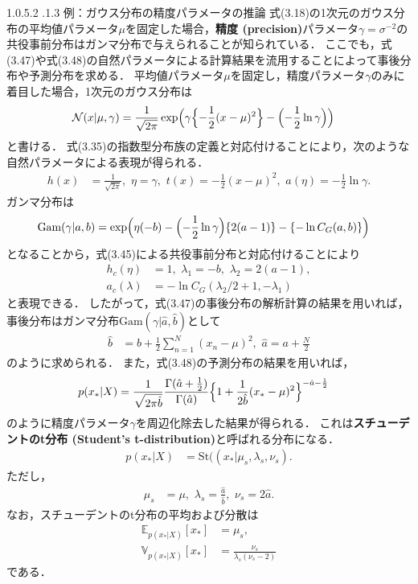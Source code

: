 \documentclass[11pt,a4paper]{jsarticle}
\makeatletter
\numberwithin{equation}{section}
\newcommand{\subsubsubsection}{\@startsection{paragraph}{4}{\z@}%
	{1.0\Cvs \@plus.5\Cdp \@minus.2\Cdp}%
	{.1\Cvs \@plus.3\Cdp}%
	{\reset@font\sffamily\normalsize}
}
\makeatother
\begin{document}
\subsubsubsection{例：ガウス分布の精度パラメータの推論}
式(3.18)の1次元のガウス分布の平均値パラメータ$\mu$を固定した場合，\textbf{精度 (precision)}パラメータ$\gamma = \sigma^{-2}$の共役事前分布はガンマ分布で与えられることが知られている．
ここでも，式(3.47)や式(3.48)の自然パラメータによる計算結果を流用することによって事後分布や予測分布を求める．
平均値パラメータ$\mu$を固定し，精度パラメータ$\gamma$のみに着目した場合，1次元のガウス分布は
\begin{align}
\mathcal{N}(x | \mu, \gamma)
& =
\frac{1}{\sqrt{2 \pi}} \exp \Bigl( \gamma \Bigl\{ -\frac{1}{2} (x - \mu)^2 \Bigr\} - \Bigl( -\frac{1}{2} \ln \gamma \Bigr) \Bigr)
\end{align}
と書ける．
式(3.35)の指数型分布族の定義と対応付けることにより，次のような自然パラメータによる表現が得られる．
\begin{align}
h(x)
& =
\frac{1}{\sqrt{2 \pi}}, \,\,
\eta = \gamma, \,\,
t(x) = -\frac{1}{2} (x - \mu)^2, \,\,
a(\eta) = -\frac{1}{2} \ln \gamma.
\end{align}
ガンマ分布は
\begin{align}
\mathrm{Gam}(\gamma | a, b)
& =
\exp \Bigl( \eta (-b) - \Bigl( -\frac{1}{2} \ln \gamma \Bigr) \{ 2 (a - 1) \} - \{ -\ln C_G(a, b) \} \Bigr)
\end{align}
となることから，式(3.45)による共役事前分布と対応付けることにより
\begin{align}
h_c(\eta)
& =
1, \,\,
\lambda_1 = -b, \,\,
\lambda_2 = 2 (a - 1), \nonumber \\
a_c(\lambda)
& =
-\ln C_G(\lambda_2/2 + 1, -\lambda_1)
\end{align}
と表現できる．
したがって，式(3.47)の事後分布の解析計算の結果を用いれば，事後分布はガンマ分布$\mathrm{Gam}(\gamma | \hat{a}, \hat{b})$として
\begin{align}
\hat{b}
& =
b + \frac{1}{2} \sum_{n=1}^N (x_n - \mu)^2, \,\,
\hat{a} = a + \frac{N}{2}
\end{align}
のように求められる．
また，式(3.48)の予測分布の結果を用いれば，
\begin{align}
p(x_\ast | X)
& =
\frac{1}{\sqrt{2 \pi \hat{b}}} \frac{\Gamma(\hat{a} + \frac{1}{2})}{\Gamma(\hat{a})} \Bigl\{ 1 + \frac{1}{2 \hat{b}} (x_\ast - \mu)^2 \Bigr\}^{-\hat{a} - \frac{1}{2}}
\end{align}
のように精度パラメータ$\gamma$を周辺化除去した結果が得られる．
これは\textbf{スチューデントのt分布 (Student's t-distribution)}と呼ばれる分布になる．
\begin{align}
p(x_\ast | X)
& =
\mathrm{St}((x_\ast | \mu_s, \lambda_s, \nu_s).
\end{align}
ただし，
\begin{align}
\mu_s
& =
\mu, \,\,
\lambda_s = \frac{\hat{a}}{\hat{b}}, \,\,
\nu_s = 2 \hat{a}.
\end{align}
なお，スチューデントのt分布の平均および分散は
\begin{align}
\mathbb{E}_{p(x_\ast | X)} [x_\ast]
& =
\mu_s, \\
\mathbb{V}_{p(x_\ast | X)} [x_\ast]
& =
\frac{\nu_s}{\lambda_s (\nu_s - 2)}
\end{align}
である．
\end{document}
